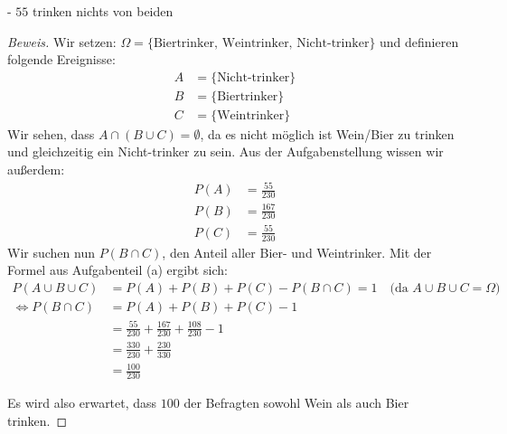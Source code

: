 \documentclass[10pt]{article}
\begin{document}
- $55$ trinken nichts von beiden
\begin{proof}[Beweis]
Wir setzen: $\Omega = \{\text{Biertrinker, Weintrinker, Nicht-trinker}\}$ und definieren folgende Ereignisse: 
\begin{align*}
    A &= \{\text{Nicht-trinker}\} \\
    B &= \{\text{Biertrinker}\} \\
    C &= \{\text{Weintrinker}\}
\end{align*}
Wir sehen, dass $A \cap (B \cup C) = \emptyset$, da es nicht möglich ist Wein/Bier zu trinken und gleichzeitig ein Nicht-trinker zu sein.
Aus der Aufgabenstellung wissen wir außerdem:
\begin{align*}
    P(A) &= \frac{55}{230} \\
    P(B) &= \frac{167}{230} \\
    P(C) &= \frac{55}{230}
\end{align*}
Wir suchen nun $P(B\cap C)$, den Anteil aller Bier- und Weintrinker. Mit der Formel aus Aufgabenteil (a) ergibt sich:
\begin{align*}
P(A \cup B \cup C) &= P(A) + P(B) + P(C) - P(B \cap C) = 1 \quad\text{(da $A\cup B\cup C = \Omega$)} \\
\Leftrightarrow P(B \cap C) &= P(A) + P(B) + P(C) - 1 \\
&= \frac{55}{230} + \frac{167}{230} + \frac{108}{230} - 1 \\
&= \frac{330}{230} + \frac{230}{330} \\
&= \frac{100}{230}
\end{align*}

Es wird also erwartet, dass $100$ der Befragten sowohl Wein als auch Bier trinken.
\end{proof}
\end{document}
